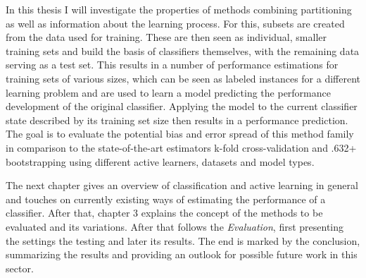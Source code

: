 In this thesis I will investigate the properties of methods combining partitioning as well as information about the learning process. For this, subsets are created from the data used for training. These are then seen as individual, smaller training sets and build the basis of classifiers themselves, with the remaining data serving as a test set. This results in a number of performance estimations for training sets of various sizes, which can be seen as labeled instances for a different learning problem and are used to learn a model predicting the performance development of the original classifier. Applying the model to the current classifier state described by its training set size then results in a performance prediction. The goal is to evaluate the potential bias and error spread of this method family in comparison to the state-of-the-art estimators k-fold cross-validation and .632+ bootstrapping using different active learners, datasets and model types.

The next chapter gives an overview of classification and active learning in general and touches on currently existing ways of estimating the performance of a classifier. After that, chapter 3 explains the concept of the methods to be evaluated and its variations. After that follows the \textit{Evaluation}, first presenting the settings the testing and later its results. The end is marked by the conclusion, summarizing the results and providing an outlook for possible future work in this sector.